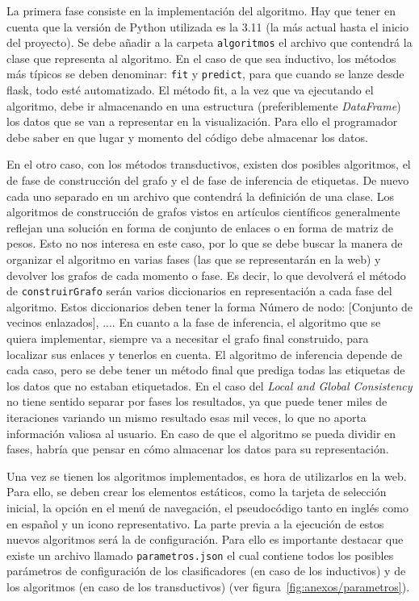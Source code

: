 La primera fase consiste en la implementación del algoritmo. Hay que tener en cuenta que la versión de Python utilizada es la 3.11 (la más actual hasta el inicio del proyecto). Se debe añadir a la carpeta \texttt{algoritmos} el archivo que contendrá la clase que representa al algoritmo. En el caso de que sea inductivo, los métodos más típicos se deben denominar: \texttt{fit} y \texttt{predict}, para que cuando se lanze desde flask, todo esté automatizado. El método fit, a la vez que va ejecutando el algoritmo, debe ir almacenando en una estructura (preferiblemente \textit{DataFrame}) los datos que se van a representar en la visualización. Para ello el programador debe saber en que lugar y momento del código debe almacenar los datos.

En el otro caso, con los métodos transductivos, existen dos posibles algoritmos, el de fase de construcción del grafo y el de fase de inferencia de etiquetas. De nuevo cada uno separado en un archivo que contendrá la definición de una clase. Los algoritmos de construcción de grafos vistos en artículos científicos generalmente reflejan una solución en forma de conjunto de enlaces o en forma de matriz de pesos. Esto no nos interesa en este caso, por lo que se debe buscar la manera de organizar el algoritmo en varias fases (las que se representarán en la web) y devolver los grafos de cada momento o fase. Es decir, lo que devolverá el método de \texttt{construirGrafo} serán varios diccionarios en representación a cada fase del algoritmo. Estos diccionarios deben tener la forma {Número de nodo: [Conjunto de vecinos enlazados], ...}. En cuanto a la fase de inferencia, el algoritmo que se quiera implementar, siempre va a necesitar el grafo final construido, para localizar sus enlaces y tenerlos en cuenta. El algoritmo de inferencia depende de cada caso, pero se debe tener un método final que prediga todas las etiquetas de los datos que no estaban etiquetados. En el caso del \textit{Local and Global Consistency} no tiene sentido separar por fases los resultados, ya que puede tener miles de iteraciones variando un mismo resultado esas mil veces, lo que no aporta información valiosa al usuario. En caso de que el algoritmo se pueda dividir en fases, habría que pensar en cómo almacenar los datos para su representación.

Una vez se tienen los algoritmos implementados, es hora de utilizarlos en la web. Para ello, se deben crear los elementos estáticos, como la tarjeta de selección inicial, la opción en el menú de navegación, el pseudocódigo tanto en inglés como en español y un icono representativo. La parte previa a la ejecución de estos nuevos algoritmos será la de configuración. Para ello es importante destacar que existe un archivo llamado \texttt{parametros.json} el cual contiene todos los posibles parámetros de configuración de los clasificadores (en caso de los inductivos) y de los algoritmos (en caso de los transductivos) (ver figura~\ref{fig:anexos/parametros}).

